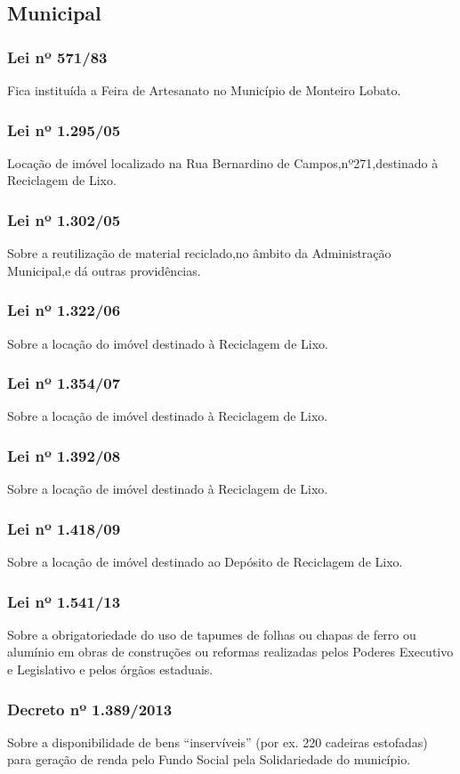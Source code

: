 \begin{subapend}
	\subsection{Municipal}
	\begin{subsubapend}
		\item \subsubsection{Lei nº 571/83}
		Fica instituída a Feira de Artesanato no Município de Monteiro Lobato.
		\subsubsection{Lei nº 1.295/05}
		Locação de imóvel localizado na Rua Bernardino de Campos,nº271,destinado à Reciclagem de Lixo.
		\subsubsection{Lei nº 1.302/05}
		Sobre a reutilização de material reciclado,no âmbito da Administração Municipal,e dá outras providências.
		\subsubsection{Lei nº 1.322/06}
		Sobre a locação do imóvel destinado à Reciclagem de Lixo.
		\subsubsection{Lei nº 1.354/07}
		Sobre a locação de imóvel destinado à Reciclagem de Lixo.
		\subsubsection{Lei nº 1.392/08}
		Sobre a locação de imóvel destinado à Reciclagem de Lixo.
		\subsubsection{Lei nº 1.418/09}
		Sobre a locação de imóvel destinado ao Depósito de Reciclagem de Lixo.
		\subsubsection{Lei nº 1.541/13}
		Sobre a obrigatoriedade do uso de tapumes de folhas ou chapas de ferro ou alumínio em obras de construções ou reformas realizadas pelos Poderes Executivo e Legislativo e pelos órgãos estaduais.
		\subsubsection{Decreto nº 1.389/2013}
		Sobre a disponibilidade de bens “inservíveis” (por ex. 220 cadeiras estofadas) para geração de renda pelo Fundo Social pela Solidariedade do município.
	\end{subsubapend}
\end{subapend}



